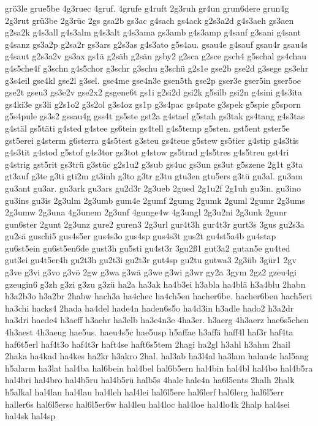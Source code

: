 {grö3le
grue5be
4g3ruec
4gruf.
4grufe
g4ruft
2g3ruh
gr4un
grun6dere
grun4g
2g3rut
grü3be
2g3rüc
2gs
gsa2b
gs3ac
g4sach
gs4ack
g2s3a2d
g4s3aeh
gs3aen
g2sa2k
g4s3all
g4s3alm
g4s3alt
g4s3ama
gs3amb
g4s3amp
g4sanf
g3sani
g4sant
g4sanz
gs3a2p
g2sa2r
gs3ars
g2s3as
g4s3ato
g5s4au.
gsau4e
g4sauf
gsau4r
gsau4s
g4saut
g2s3a2v
gs3ax
gs1ä
g2säh
g2sän
gsby2
g2sca
g2sce
gsch4
g5schal
gs4chau
g4s5che4f
g3schn
g4s5chor
g3schr
g3schu
g3schü
g2s1e
gse2b
gse2d
g3sege
gs3ehr
g3s4eil
gse4kl
gse2l
g3sel.
gse4me
gse4n3e
gsen5th
gse2p
gser3e
gser5in
gser5oe
gse2t
gseu3
gs3e2v
gse2x2
gsgene6t
gs1i
g2si2d
gsi2k
g5silb
gsi2n
g4sini
g4s3ita
gs4ki3e
gs3li
g2s1o2
g3s2ol
g3s4oz
gs1p
g3s4pac
gs4pate
g3spek
g5spie
g5sporn
g5s4pule
gs3s2
gssau4g
gss4t
gs5ste
gst2a
g4stael
g5stah
gs3tak
gs4tang
g4s3tas
g4stäl
gs5täti
g4sted
g4stee
gs6tein
gs4tell
g4s5temp
g5sten.
gst5ent
gster5e
gst5erei
g4sterm
g6sterra
g4s5test
g3steu
gs4teue
g5stew
gs5tier
g4stip
g4s3tis
g4s3tit
g4stod
g5stof
g4s3tor
gs3tot
g4stow
gs5trad
g4s5tres
g4s5treu
gst4ri
g4strig
gst5rit
gs3trü
g3stüc
g2s1u2
g3sub
gs4uc
gs3un
gs3ut
g5szene
2g1t
g3ta
gt3auf
g3te
g3ti
gti2m
gt3inh
g3to
g3tr
g3tu
gtu3en
gtu5ers
g3tü
gu3al.
gu3am
gu3ant
gu3ar.
gu3ark
gu3ars
gu2d3r
2g3ueb
2gued
2g1u2f
2g1uh
gu3in.
gu3ino
gu3ins
gu3is
2g3ulm
2g3umb
gum4e
2gumf
2gumg
2gumk
2guml
2gumr
2g3ums
2g3umw
2g3una
4g3unem
2g3unf
4gunge4w
4g3ungl
2g3u2ni
2g3unk
2gunr
gun6ster
2gunt
2g3unz
gure2
guren3
2g3url
gur4t3h
gur4t3r
gurt3s
3gus
gu2s3a
gu2sä
guschi5
gus4s5er
gus4s3o
gus4sp
gus4s3t
gus2t
gu4st5a4b
gu4stap
gu6st5ein
gu6st5en6de
gust3h
gu5sti
gu4st3r
3gu2ß1
gut3a2
gutan5e
gu4ted
gut3ei
gu4t5er4h
gu2t3h
gu2t3i
gu2t3r
gut4sp
gu2tu
gutwa3
2g3üb
3gür1
2gv
g3ve
g3vi
g3vo
g3vö
2gw
g3wa
g3wä
g3we
g3wi
g3wr
gy2a
3gym
2gz2
gzeu4gi
gzeugin6
g3zh
g3zi
g3zu
g3zü
ha2a
ha3ak
ha4b3ei
h3abla
ha4blä
h3a4blu
2habn
h3a2b3o
h3a2br
2habw
hach3a
ha4chec
ha4ch5en
hacher6be.
hacher6ben
hach5eri
ha3chi
hacks4
2hada
ha4del
hade4n
haden6s5o
ha4d3in
h3adle
hado2
h3a2dr
ha3dri
haede4
h3aeff
h3aehr
ha3elb
ha3e4n3e
4ha3er.
h3aerg
4h3aerz
hae6s5chen
4h3aest
4h3aeug
hae5us.
haeu4s5c
hae5usp
h5affae
h3affä
haff4l
haf3r
haf4ta
haf6t5erl
haf4t3o
haf4t3r
haft4se
haft6s5tem
2hagi
ha2gl
h3ahl
h3ahm
2hail
2haka
ha4kad
ha4kes
ha2kr
h3akro
2hal.
hal3ab
ha3l4al
ha3lam
halan4c
hal5ang
h5alarm
ha3lat
hal4ba
hal6bein
hal4bel
hal6b5ern
hal4bin
hal4bl
hal4bo
hal4b5ra
hal4bri
hal4bro
hal4b5ru
hal4b5rü
halb5s
4hale
hale4n
ha6l5ents
2halh
2halk
h5alkal
hal4lan
hal4lau
hal4leh
hal4lei
hal6l5ere
hal6lerf
hal6lerg
hal6l5err
haller6s
hal6l5ersc
hal6l5er6w
hal4leu
hal4loc
hal4loe
hal4lo4k
2halp
hal4sei
hal4sk
hal4sp
}
